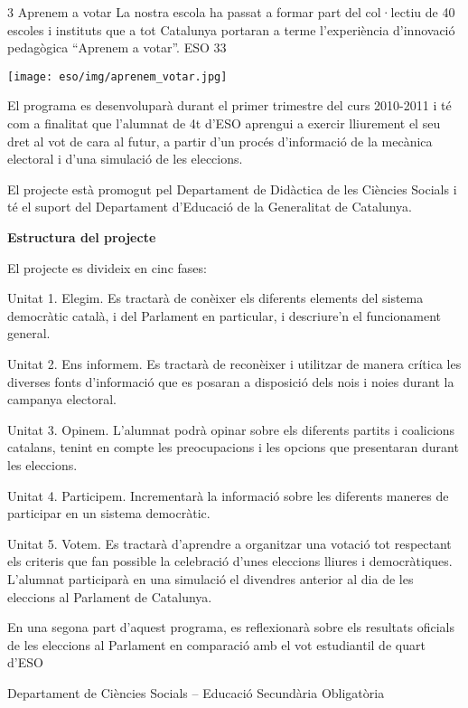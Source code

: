 \begin{news}
{3} %
{Aprenem a votar}
{La nostra escola ha passat a formar part del col·lectiu de 40 escoles i instituts que a tot Catalunya portaran a terme l’experiència d’innovació pedagògica “Aprenem a votar”. 
}
{ESO}
{33} %

\noindent\texttt{[image: eso/img/aprenem\_votar.jpg]}

El programa es desenvoluparà durant el primer trimestre del curs 2010-2011 i té com a finalitat que l’alumnat de 4t d’ESO aprengui a exercir lliurement el seu dret al vot de cara al futur, a partir d’un procés d’informació de la mecànica electoral i d’una simulació de les eleccions.

El projecte està promogut pel Departament de Didàctica de les Ciències Socials i té el suport del Departament d’Educació de la Generalitat de Catalunya.


\bf Estructura del projecte  

\rm
El projecte es divideix en cinc fases:

Unitat 1. Elegim. Es tractarà de conèixer els diferents elements del sistema democràtic català, i del Parlament en particular, i descriure’n el funcionament general.

Unitat 2. Ens informem. Es tractarà de reconèixer i utilitzar de manera crítica les diverses fonts d’informació que es posaran a disposició dels nois i noies durant la campanya electoral.

Unitat 3. Opinem.  L’alumnat podrà opinar sobre els diferents partits i coalicions catalans, tenint en compte les preocupacions i les opcions que presentaran durant les eleccions.

Unitat 4. Participem. Incrementarà la informació sobre les diferents maneres de participar en un sistema democràtic.


Unitat 5. Votem. Es tractarà d’aprendre a organitzar una votació tot respectant els criteris que fan possible la celebració d’unes eleccions lliures i democràtiques. L’alumnat participarà en una simulació el divendres anterior al dia de les eleccions al Parlament de Catalunya. 


En una segona part d’aquest programa, es reflexionarà sobre els resultats oficials de les eleccions al Parlament en comparació amb el vot estudiantil de quart d’ESO

Departament de Ciències Socials – Educació Secundària Obligatòria

\end{news}


